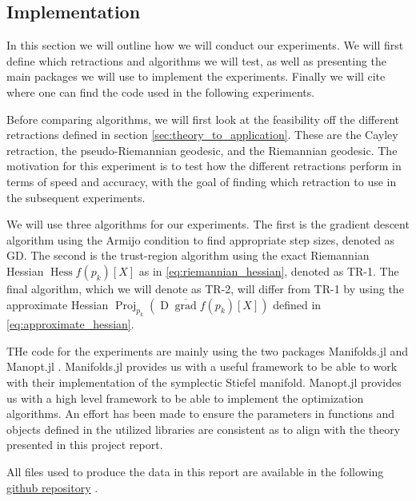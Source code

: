 \subsection{Implementation}
In this section we will outline how we will conduct our experiments. We will first define which retractions and algorithms we will test, as well as presenting the main packages we will use to implement the experiments. Finally we will cite where one can find the code used in the following experiments. 

Before comparing algorithms, we will first look at the feasibility off the different retractions defined in section \ref{sec:theory_to_application}. These are the Cayley retraction, the pseudo-Riemannian geodesic, and the Riemannian geodesic. The motivation for this experiment is to test how the different retractions perform in terms of speed and accuracy, with the goal of finding which retraction to use in the subsequent experiments.

We will use three algorithms for our experiments. The first is the gradient descent algorithm using the Armijo condition to find appropriate step sizes, denoted as GD. The second is the trust-region algorithm using the exact Riemannian Hessian $\operatorname{Hess}f(p_{k})[X]$ as in \eqref{eq:riemannian_hessian}, denoted as TR-1. The final algorithm, which we will denote as TR-2, will differ from TR-1 by using the approximate Hessian $\operatorname{Proj}_{p_{k}}(\operatorname{D}\overline{\operatorname{grad}}f(p_{k})[X])$ defined in \eqref{eq:approximate_hessian}.

THe code for the experiments are mainly using the two packages Manifolds.jl \cite{AxenBaranBergmannRzecki:2023} and Manopt.jl \cite{Bergmann2022}. Manifolds.jl provides us with a useful framework to be able to work with their implementation of the symplectic Stiefel manifold. Manopt.jl provides us with a high level framework to be able to implement the optimization algorithms. An effort has been made to ensure the parameters in functions and objects defined in the utilized libraries are consistent as to align with the theory presented in this project report. 

All files used to produce the data in this report are available in the following \href{https://github.com/kellertuer/TMA4500-Project-Hovland-Symplectic-Stiefel.git}{github repository} \cite{Hovland2024}. 